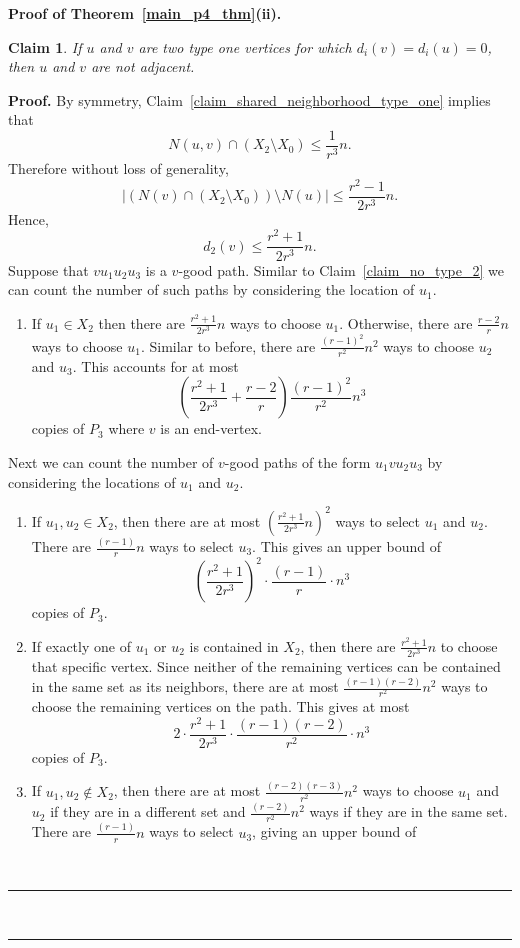 \documentclass[12pt]{article}
\newtheorem{claim}[thm]{Claim}
\renewenvironment{proof}[1][Proof]{\textbf{#1.} }{\ \rule{0.5em}{0.5em}}
\begin{document}
\begin{proof}[Proof of Theorem~\ref{main_p4_thm}(ii)]
\begin{claim}\label{claim_no_type_one}
If $u$ and $v$ are two type one vertices for which $d_i(v) = d_i(u) = 0$, then $u$ and $v$ are not adjacent. 
\end{claim}
\begin{proof}
By symmetry, Claim~\ref{claim_shared_neighborhood_type_one} implies that
\[ 
N(u,v) \cap (X_2 \setminus X_0)  \leq \frac{1}{r^3}n.
\]
Therefore without loss of generality, 
\[ 
|( N(v) \cap (X_2 \setminus X_0) ) \setminus N(u)| \leq \frac{r^2 - 1}{2r^3}n.
\]
Hence, 
\[ d_2(v) \leq \frac{r^2 +1}{2r^3} n.\]
Suppose that $vu_1u_2u_3$ is a $v$-good path. Similar to Claim~\ref{claim_no_type_2} we can count the number of such paths by considering the location of $u_1$. 
\begin{enumerate}
    \item If $u_1 \in X_2$ then there are $\frac{r^2 +1}{2r^3}n$ ways to choose $u_1$. Otherwise, there are $\frac{r-2}{r}n$ ways to choose $u_1$. Similar to before, there are $\frac{(r-1)^2}{r^2}n^2$ ways to choose $u_2$ and $u_3$. This accounts for at most  
    \[ 
    \left(\frac{r^2 +1}{2r^3} + \frac{r-2}{r} \right) \frac{(r-1)^2}{r^2}n^3
    \]
    copies of $P_3$ where $v$ is an end-vertex.
\end{enumerate}
Next we can count the number of $v$-good paths of the form $u_1vu_2u_3$ by considering the locations of $u_1$ and $u_2$. 
\begin{enumerate}
    \item If $u_1,u_2 \in X_2$, then there are at most $\left(\frac{r^2 +1}{2r^3}n\right)^2$ ways to select $u_1$ and $u_2$. There are $\frac{(r-1)}{r}n$ ways to select $u_3$. This gives an upper bound of
    \[ \left(\frac{r^2 +1}{2r^3}\right)^2\cdot \frac{(r-1)}{r} \cdot n^3 \]
    copies of $P_3$. 
    \item If exactly one of $u_1$ or $u_2$ is contained in $X_2$, then there are $\frac{r^2 +1}{2r^3}n$ to choose that specific vertex. Since neither of the remaining vertices can be contained in the same set as its neighbors, there are at most $\frac{(r-1)(r-2)}{r^2}n^2$ ways to choose the remaining vertices on the path. This gives at most
    \[ 2\cdot \frac{r^2 +1}{2r^3} \cdot \frac{(r-1)(r-2)}{r^2} \cdot n^3 \]
    copies of $P_3$. 
    \item If $u_1,u_2 \notin X_2$, then there are at most $\frac{(r-2)(r-3)}{r^2}n^2$ ways to choose $u_1$ and $u_2$ if they are in a different set and $\frac{(r-2)}{r^2}n^2$ ways if they are in the same set. There are $\frac{(r-1)}{r}n$ ways to select $u_3$, giving an upper bound of

\end{enumerate}
\end{proof}
\end{proof}
\end{document}

